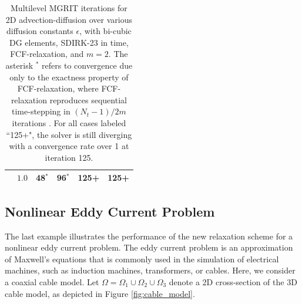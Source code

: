 \documentclass[VANCOUVER,STIX1COL]{WileyNJD-v2}
\begin{document}
\begin{table}[h!]
\begin{tabular}{c r|c|c|c|c}
                                                &$1.0$  & 48$^{*}$ & 96$^{*}$ &125+& 125+ \\ \midrule
\end{tabular}
   \caption{Multilevel MGRIT iterations for 2D advection-diffusion over various diffusion constants $\epsilon$, with bi-cubic DG elements, SDIRK-23 in time, FCF-relaxation, and $m=2$.  The asterisk $^{*}$ refers to convergence due only to the exactness property of FCF-relaxation, where FCF-relaxation reproduces sequential time-stepping in $(N_t-1)/2m$ iterations \cite{Fa2014}.  For all cases labeled ``125+", the solver is still diverging with a convergence rate over 1 at iteration 125. }
\label{tab:order3_Astable_CD}
\end{table}


\subsection{Nonlinear Eddy Current Problem}
The last example illustrates the performance of the new relaxation scheme for a nonlinear eddy current problem. The eddy current problem is an approximation of Maxwell's equations that is commonly used in the simulation of electrical machines, such as induction machines, transformers, or cables. Here, we consider a coaxial cable model. Let $\Omega = \Omega_1\cup\Omega_2\cup\Omega_3$ denote a 2D cross-section of the 3D cable model, as depicted in Figure \ref{fig:cable_model}. 
\end{document}
